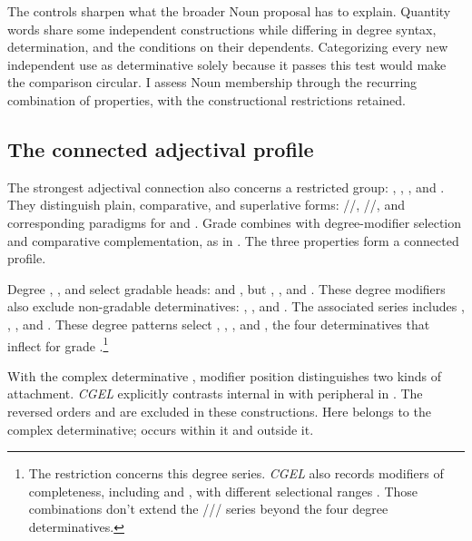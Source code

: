 \documentclass[12pt]{article}
\begin{document}
The controls sharpen what the broader Noun proposal has to explain. Quantity words share some independent constructions while differing in degree syntax, determination, and the conditions on their dependents. Categorizing every new independent use as determinative solely because it passes this test would make the comparison circular. I assess Noun membership through the recurring combination of properties, with the constructional restrictions retained.

\subsection{The connected adjectival profile}\label{sec:adjectival-profile}

The strongest adjectival connection also concerns a restricted group: , , , and . They distinguish plain, comparative, and superlative forms: /\allowbreak{}/\allowbreak{}, /\allowbreak{}/\allowbreak{}, and corresponding paradigms for  and  \citep[391--395]{huddleston2002}. Grade combines with degree-modifier selection and comparative complementation, as in . The three properties form a connected profile.

Degree , , and  select gradable heads:  and , but , , and . These degree modifiers also exclude non-gradable determinatives: , , and . The associated series includes , , , and . These degree patterns select , , , and , the four determinatives that inflect for grade \citep[393--395, 431--432]{huddleston2002}.\footnote{The restriction concerns this degree series. \textit{CGEL} also records modifiers of completeness, including  and , with different selectional ranges \citep[432]{huddleston2002}. Those combinations don't extend the /// series beyond the four degree determinatives.}

With the complex determinative , modifier position distinguishes two kinds of attachment. \textit{CGEL} explicitly contrasts internal  in  with peripheral  in  \citep[p.~392, (61)]{huddleston2002}. The reversed orders  and  are excluded in these constructions. Here  belongs to the complex determinative;  occurs within it and  outside it.
\end{document}
